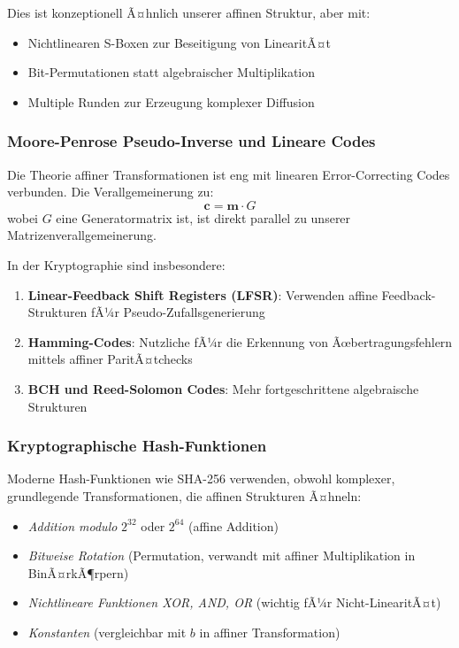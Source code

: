 ﻿\documentclass[12pt,a4paper]{article}
\begin{document}
	Dies ist konzeptionell Ã¤hnlich unserer affinen Struktur, aber mit:
	\begin{itemize}
		\item Nichtlinearen S-Boxen zur Beseitigung von LinearitÃ¤t
		\item Bit-Permutationen statt algebraischer Multiplikation
		\item Multiple Runden zur Erzeugung komplexer Diffusion
	\end{itemize}
	
	\subsubsection{Moore-Penrose Pseudo-Inverse und Lineare Codes}
	
	Die Theorie affiner Transformationen ist eng mit linearen Error-Correcting Codes verbunden. Die Verallgemeinerung zu:
	\begin{equation}
		\mathbf{c} = \mathbf{m} \cdot G
	\end{equation}
	wobei $G$ eine Generatormatrix ist, ist direkt parallel zu unserer Matrizenverallgemeinerung.
	
	In der Kryptographie sind insbesondere:
	\begin{enumerate}
		\item \textbf{Linear-Feedback Shift Registers (LFSR)}: Verwenden affine Feedback-Strukturen fÃ¼r Pseudo-Zufallsgenerierung
		\item \textbf{Hamming-Codes}: Nutzliche fÃ¼r die Erkennung von Ãœbertragungsfehlern mittels affiner ParitÃ¤tchecks
		\item \textbf{BCH und Reed-Solomon Codes}: Mehr fortgeschrittene algebraische Strukturen
	\end{enumerate}
	
	\subsubsection{Kryptographische Hash-Funktionen}
	
	Moderne Hash-Funktionen wie SHA-256 verwenden, obwohl komplexer, grundlegende Transformationen, die affinen Strukturen Ã¤hneln:
	\begin{itemize}
		\item \textit{Addition modulo } $2^{32}$ oder $2^{64}$ (affine Addition)
		\item \textit{Bitweise Rotation} (Permutation, verwandt mit affiner Multiplikation in BinÃ¤rkÃ¶rpern)
		\item \textit{Nichtlineare Funktionen XOR, AND, OR} (wichtig fÃ¼r Nicht-LinearitÃ¤t)
		\item \textit{Konstanten} (vergleichbar mit $b$ in affiner Transformation)
	\end{itemize}
	
\end{document}
